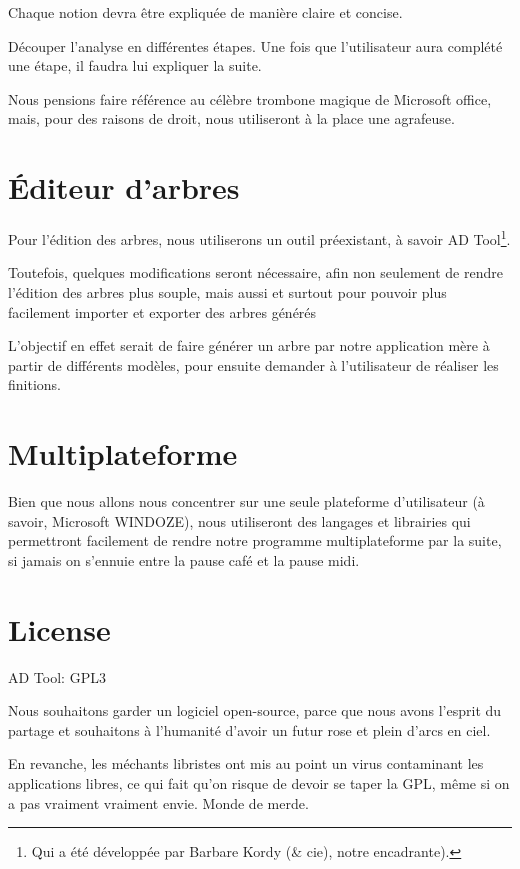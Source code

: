         Chaque notion devra être expliquée de manière claire et concise.
        
        Découper l'analyse en différentes étapes. Une fois que l'utilisateur aura complété une étape, il faudra lui expliquer la suite.
        
        Nous pensions faire référence au célèbre trombone magique de Microsoft office, mais, pour des raisons de droit, nous utiliseront à la place une agrafeuse.
        
    \section{\'Editeur d'arbres}
        Pour l'édition des arbres, nous utiliserons un outil préexistant, à savoir AD Tool\footnote{Qui a été développée par Barbare Kordy (\& cie), notre encadrante).}.
        
        Toutefois, quelques modifications seront nécessaire, afin non seulement de rendre l'édition des arbres plus souple, mais aussi et surtout pour pouvoir plus facilement importer et exporter des arbres générés
        
        L'objectif en effet serait de faire générer un arbre par notre application mère à partir de différents modèles, pour ensuite demander à l'utilisateur de réaliser les finitions.
    
	\section{Multiplateforme}
        Bien que nous allons nous concentrer sur une seule plateforme d'utilisateur (à savoir, Microsoft WINDOZE), nous utiliseront des langages et librairies qui permettront facilement de rendre notre programme multiplateforme par la suite, si jamais on s’ennuie entre la pause café et la pause midi.

    \section{License}
    	AD Tool: GPL3
        
        Nous souhaitons garder un logiciel open-source, parce que nous avons l'esprit du partage et souhaitons à l'humanité d'avoir un futur rose et plein d'arcs en ciel.
        
        En revanche, les méchants libristes ont mis au point un virus contaminant les applications libres, ce qui fait qu'on risque de devoir se taper la GPL, même si on a pas vraiment vraiment envie. Monde de merde.